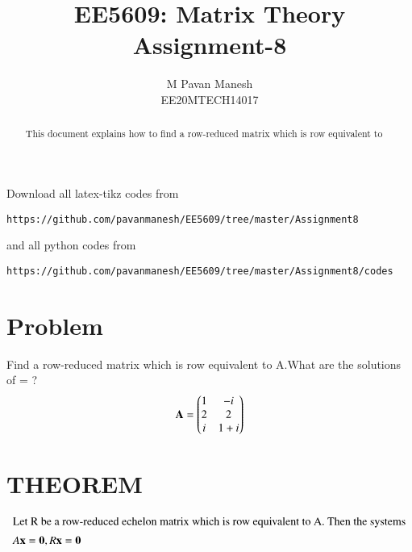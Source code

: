 \documentclass[journal,12pt,twocolumn]{IEEEtran}
\begin{document}
\makeatletter
{}
\makeatother
\let\StandardTheFigure\thefigure
\let\vec\mathbf
\renewcommand{\thefigure}{\theproblem}
\def\putbox#1#2#3{\makebox[0in][l]{\makebox[#1][l]{}\raisebox{\baselineskip}[0in][0in]{\raisebox{#2}[0in][0in]{#3}}}}
     \def\rightbox#1{\makebox[0in][r]{#1}}
     \def\centbox#1{\makebox[0in]{#1}}
     \def\topbox#1{\raisebox{-\baselineskip}[0in][0in]{#1}}
     \def\midbox#1{\raisebox{-0.5\baselineskip}[0in][0in]{#1}}
\vspace{3cm}
\title{EE5609: Matrix Theory\\
          Assignment-8\\}
\author{M Pavan Manesh\\
EE20MTECH14017 }
\maketitle
\newpage
\bigskip
\renewcommand{\thefigure}{\theenumi}
\renewcommand{\thetable}{\theenumi}
\begin{abstract}
This document explains how to find a row-reduced matrix which is row equivalent to
\end{abstract}
Download all latex-tikz codes from 
%
\begin{lstlisting}
https://github.com/pavanmanesh/EE5609/tree/master/Assignment8
\end{lstlisting}
and all python codes from 
\begin{lstlisting}
https://github.com/pavanmanesh/EE5609/tree/master/Assignment8/codes
\end{lstlisting}
%
\section{Problem}
Find a row-reduced matrix which is row equivalent to A.What are the solutions of \vec{A}\vec{x}=\vec{0} ?
\begin{align}
\vec{A} = \myvec{1&-i\\2&2\\i& 1+i}\label{A}
\end{align}

\section{THEOREM}
\begin{align}
\intertext{Let R be a row-reduced echelon matrix which is row equivalent to A. Then the systems}
A \vec{x} = \vec{0}, R \vec{x} = \vec{0} \label{th}\end{align}
\end{document}
